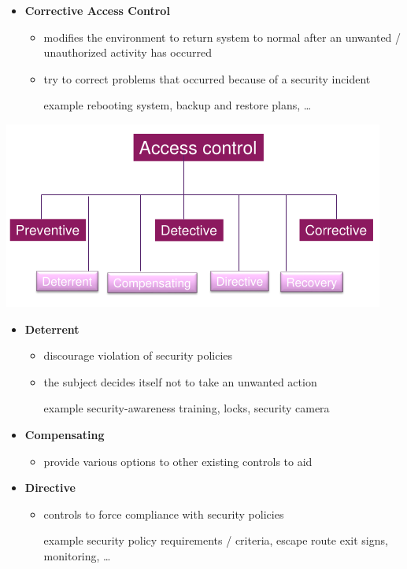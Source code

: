 \documentclass[11pt,twoside,landscape]{article}
\begin{document}
\begin{multicols}{4}
\begin{itemize}
\item \textbf{Corrective Access Control}
\begin{itemize}
\item modifies the environment to return system to normal after an unwanted / unauthorized activity has occurred
\item try to correct problems that occurred because of a security incident
\item[{example}] rebooting system, backup and restore plans, \ldots{}
\end{itemize}
\end{itemize}


\begin{center}
\includegraphics[width=.9\linewidth]{static/img/cysec/other_access_control_types.png}
\end{center}

\begin{itemize}
\item \textbf{Deterrent}
\begin{itemize}
\item discourage violation of security policies
\item the subject decides itself not to take an unwanted action
\item[{example}] security-awareness training, locks, security camera
\end{itemize}

\item \textbf{Compensating}
\begin{itemize}
\item provide various options to other existing controls to aid
\end{itemize}

\item \textbf{Directive}
\begin{itemize}
\item controls to force compliance with security policies
\item[{example}] security policy requirements / criteria, escape route exit signs, monitoring, \ldots{}
\end{itemize}


\end{itemize}
\end{multicols}
\end{document}
